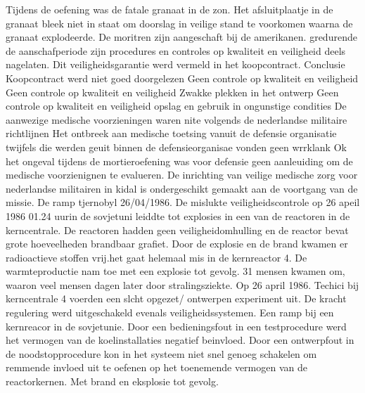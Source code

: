 Tijdens de oefening was de fatale granaat in de zon.
Het afsluitplaatje in de granaat bleek niet in staat om doorslag in veilige stand te voorkomen waarna de granaat explodeerde.
De moritren zijn aangeschaft bij de amerikanen. gredurende de aanschafperiode zijn procedures en controles op kwaliteit en veiligheid deels nagelaten.
Dit veiligheidsgarantie werd vermeld in het koopcontract.
Conclusie
Koopcontract werd niet goed doorgelezen
Geen controle op kwaliteit en veiligheid
Geen controle op kwaliteit en veiligheid
Zwakke plekken in het ontwerp
Geen controle op kwaliteit en veiligheid
opslag en gebruik in ongunstige condities
De aanwezige medische voorzieningen waren nite volgends de nederlandse militaire richtlijnen
Het ontbreek aan medische toetsing vanuit de defensie organisatie
twijfels die werden geuit binnen de defensieorganisae vonden geen wrrklank
Ok het ongeval tijdens de mortieroefening was voor defensie geen aanleuiding om de medische voorzienignen te evalueren.
De inrichting van veilige medische zorg voor nederlandse militairen in kidal is ondergeschikt gemaakt aan de voortgang van de missie.
\cite{bnnvara13062018malirapport}
\cite{eucal11012021malimissieverlengd}
\cite{nos21052014zorgenmalimissie}
\cite{meijnders}
\cite{bnrwebredactie}
\cite{keultjes01062016malimissiecoalitie}
\cite{veenhof18012019}
\cite{isitman06012016militair}
\cite{nporadio11072016filmdemissie}
\cite{parlementairmonitor15122013mortierongeluk}
\newline \indent De ramp tjernobyl 26/04/1986. \cite{INSAVienna1992Chernobyl}
De mislukte veiligheidscontrole op 26 apeil 1986 01.24 uurin de sovjetuni leiddte tot explosies in een van de reactoren in de kerncentrale. De reactoren hadden geen veiligheidomhulling en de reactor bevat grote hoeveelheden brandbaar grafiet.
Door de explosie en de brand kwamen er radioactieve stoffen vrij.het gaat helemaal mis in de kernreactor 4. De warmteproductie nam  toe met een explosie tot gevolg.
31 mensen kwamen om, waaron veel mensen dagen later door stralingsziekte.
 Op 26 april 1986. Techici bij kerncentrale 4 voerden een slcht opgezet/ ontwerpen experiment uit. De  kracht regulering werd uitgeschakeld evenals veiligheidssystemen. 
Een ramp bij een kernreacor in de sovjetunie. Door een bedieningsfout in een testprocedure werd het vermogen van de koelinstallaties negatief beinvloed. Door een ontwerpfout in de noodstopprocedure kon in het systeem niet snel genoeg schakelen om remmende invloed uit te oefenen op het toenemende vermogen van de reactorkernen. Met brand en eksplosie tot gevolg.
